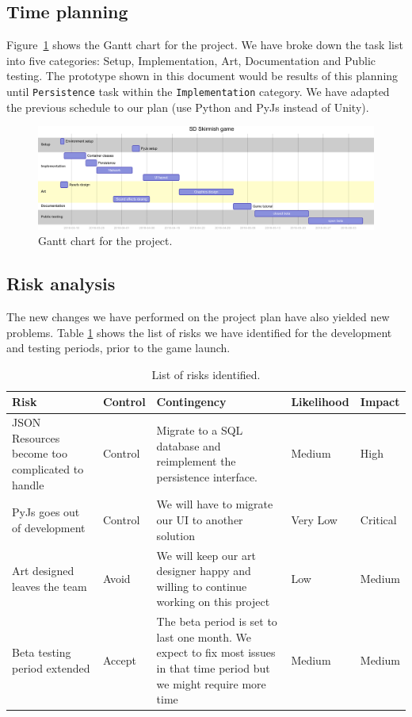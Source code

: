 \documentclass{article}
\begin{document}
\subsection*{Time planning}
Figure~\ref{fig:gantt} shows the Gantt chart for the project. We have broke down the task list into five categories: Setup, Implementation, Art, Documentation and Public testing. The prototype shown in this document would be results of this planning until \texttt{Persistence} task within the \texttt{Implementation} category. We have adapted the previous schedule to our plan (use Python and PyJs instead of Unity).

\begin{figure}
	\centering
	\includegraphics[width=.99\textwidth]{gantt}
	\caption{Gantt chart for the project.}
	\label{fig:gantt}
\end{figure}

\subsection*{Risk analysis}
The new changes we have performed on the project plan have also yielded new problems. Table \ref{tab:risks} shows the list of risks we have identified for the development and testing periods, prior to the game launch.

\begin{table}
	\centering
	\begin{tabular}{p{4cm}|p{1.5cm}p{5.5cm}p{1.5cm}p{1cm}}
		\toprule
		Risk                                            & Control & Contingency                                                                                                               & Likelihood & Impact   \\ \midrule
		JSON Resources become too complicated to handle & Control & Migrate to a SQL database and reimplement the persistence interface.                                                      & Medium     & High     \\
		PyJs goes out of development                    & Control & We will have to migrate our UI to another solution                                                                        & Very Low   & Critical \\
		Art designed leaves the team                    & Avoid   & We will keep our art designer happy and willing to continue working on this project                                       & Low        & Medium   \\
		Beta testing period extended                    & Accept  & The beta period is set to last one month. We expect to fix most issues in that time period but we might require more time & Medium     & Medium
	\end{tabular}
	\caption{List of risks identified.}
	\label{tab:risks}
\end{table}
\end{document}
